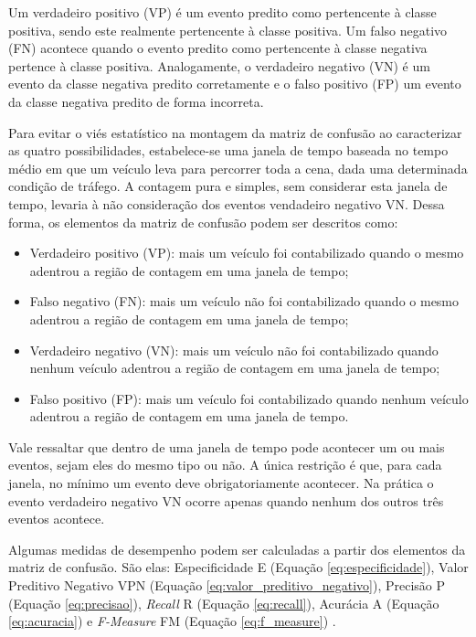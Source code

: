 Um verdadeiro positivo (VP) é um evento predito como pertencente à classe positiva, sendo este realmente pertencente à classe positiva. Um falso negativo (FN) acontece quando o evento predito como pertencente à classe negativa pertence à classe positiva. Analogamente, o verdadeiro negativo (VN) é um evento da classe negativa predito corretamente e o falso positivo (FP) um evento da classe negativa predito de forma incorreta.

Para evitar o viés estatístico na montagem da matriz de confusão ao caracterizar as quatro possibilidades, estabelece-se uma janela de tempo baseada no tempo médio em que um veículo leva para percorrer toda a cena, dada uma determinada condição de tráfego. A contagem pura e simples, sem considerar esta janela de tempo, levaria à não consideração dos eventos vendadeiro negativo VN. Dessa forma, os elementos da matriz de confusão podem ser descritos como:

\begin{itemize}
  \item Verdadeiro positivo (VP): mais um veículo foi contabilizado quando o mesmo adentrou a região de contagem em uma janela de tempo;
  \item Falso negativo (FN): mais um veículo não foi contabilizado quando o mesmo adentrou a região de contagem em uma janela de tempo;
  \item Verdadeiro negativo (VN): mais um veículo não foi contabilizado quando nenhum veículo adentrou a região de contagem em uma janela de tempo;
  \item Falso positivo (FP): mais um veículo foi contabilizado quando nenhum veículo adentrou a região de contagem em uma janela de tempo.
\end{itemize}

Vale ressaltar que dentro de uma janela de tempo pode acontecer um ou mais eventos, sejam eles do mesmo tipo ou não. A única restrição é que, para cada janela, no mínimo um evento deve obrigatoriamente acontecer. Na prática o evento verdadeiro negativo VN ocorre apenas quando nenhum dos outros três eventos acontece.

Algumas medidas de desempenho podem ser calculadas a partir dos elementos da matriz de confusão. São elas: Especificidade E (Equação \ref{eq:especificidade}), Valor Preditivo Negativo VPN (Equação \ref{eq:valor_preditivo_negativo}), Precisão P (Equação \ref{eq:precisao}), \textit{Recall} R (Equação \ref{eq:recall}), Acurácia A (Equação \ref{eq:acuracia}) e \textit{F-Measure} FM (Equação \ref{eq:f_measure}) \citep{powers07evaluation}.

